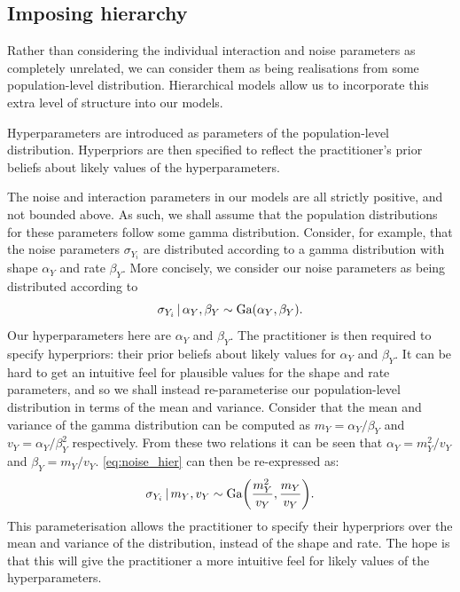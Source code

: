 \subsection{Imposing hierarchy}

Rather than considering the individual interaction and noise parameters as completely
unrelated, we can consider them as being realisations from some population-level
distribution. Hierarchical models allow us to incorporate this extra level of structure
into our models.

Hyperparameters are introduced as parameters of the population-level distribution.
Hyperpriors are then specified to reflect the practitioner's prior beliefs about likely
values of the hyperparameters.

The noise and interaction parameters in our models are all strictly positive, and not
bounded above. As such, we shall assume that the population distributions for these
parameters follow some gamma distribution. Consider, for example, that the noise
parameters $\sigma_{Y_i}$ are distributed according to a gamma distribution with shape
$\alpha_Y$ and rate $\beta_Y$. More concisely, we consider our noise parameters as being
distributed according to
\begin{equation}
    \label{eq:noise_hier}
    \sigma_{Y_i}\,|\,\alpha_Y,\beta_Y \sim \textrm{Ga}(\alpha_Y, \beta_Y).
\end{equation}
Our hyperparameters here are $\alpha_Y$ and $\beta_Y$. The practitioner is then
required to specify hyperpriors: their prior beliefs about likely values for $\alpha_Y$
and $\beta_Y$. It can be hard to get an intuitive feel for plausible values for the shape
and rate parameters, and so we shall instead re-parameterise our population-level
distribution in terms of the mean and variance. Consider that the mean and variance of the
gamma distribution can be computed as $m_Y = \alpha_Y / \beta_Y$ and $v_Y =
\alpha_Y/\beta_Y^2$ respectively. From these two relations it can be seen that $\alpha_Y =
m_Y^2 / v_Y$ and $\beta_Y = m_Y / v_Y$. \cref{eq:noise_hier} can then be re-expressed as:
\begin{equation}
    \sigma_{Y_i}\,|\, m_Y, v_Y \sim \textrm{Ga}\bigg(\frac{m_Y^2}{v_Y}, \frac{m_Y}{v_Y}\bigg).
\end{equation}
This parameterisation allows the practitioner to specify their hyperpriors over the mean
and variance of the distribution, instead of the shape and rate. The hope is that this
will give the practitioner a more intuitive feel for likely values of the hyperparameters.

